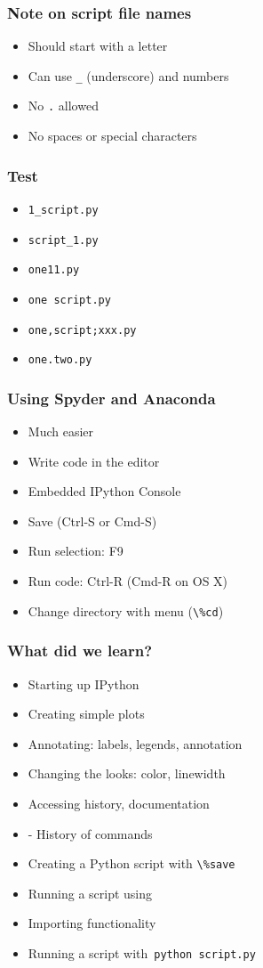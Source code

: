 \documentclass[14pt,compress]{beamer}
\newcounter{time}
\newcommand{\inctime}[1]{\addtocounter{time}{#1}{\tiny \thetime\ m}}
\newcommand{\typ}[1]{\lstinline{#1}}
\newcommand{\kwrd}[1]{ \texttt{\textbf{\color{blue}{#1}}}  }
\begin{document}
\begin{frame}[fragile]
  \frametitle{Note on script file names}
  \begin{itemize}
  \item Should start with a letter
  \item Can use \typ{_} (underscore) and numbers
  \item No \typ{.} allowed
  \item No spaces or special characters
  \end{itemize}
\end{frame}

\begin{frame}[fragile]
  \frametitle{Test}
  \begin{itemize}
  \item \typ{1_script.py}
  \item \typ{script_1.py}
  \item \typ{one11.py}
  \item \typ{one script.py}
  \item \typ{one,script;xxx.py}
  \item \typ{one.two.py}
  \end{itemize}
\end{frame}

\begin{frame}
  \frametitle{Using Spyder and Anaconda}
  \begin{itemize}
  \item Much easier
  \item Write code in the editor
  \item Embedded IPython Console
  \item Save (Ctrl-S or Cmd-S)
  \item Run selection: F9
  \item Run code: Ctrl-R (Cmd-R on OS X)
  \item Change directory with menu (\typ{\%cd})
  \end{itemize}
  \inctime{5}
\end{frame}


\begin{frame}[fragile]
  \frametitle{What did we learn?}
  \begin{itemize}
    \item Starting up IPython
    \item Creating simple plots
    \item Annotating: labels, legends, annotation
    \item Changing the looks: color, linewidth
    \item Accessing history, documentation
    \item \kwrd{\%hist} - History of commands
    \item Creating a Python script with \typ{\%save}
    \item Running a script using \kwrd{\%run -i}
    \item Importing functionality
    \item Running a script with\ \typ{python script.py}
  \end{itemize}
\end{frame}
\end{document}

